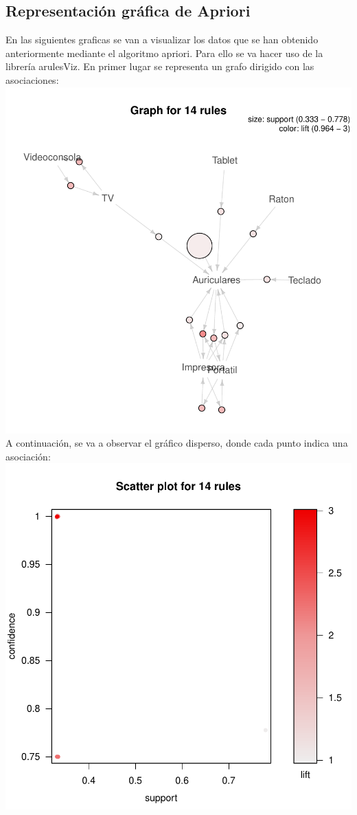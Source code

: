 \documentclass [a4paper] {article}
\begin{document}
\subsection{Representación gráfica de Apriori}
En las siguientes graficas se van a visualizar los datos que se han obtenido anteriormente mediante el algoritmo apriori. Para ello se va hacer uso de la librería arulesViz. En primer lugar se representa un grafo dirigido con las asociaciones:
\newline
\includegraphics{Memoria-Figura 9}
\newline
A continuación, se va a observar el gráfico disperso, donde cada punto indica una asociación:
\newline
\includegraphics{Memoria-Figura 10}
\newline
\end{document}
